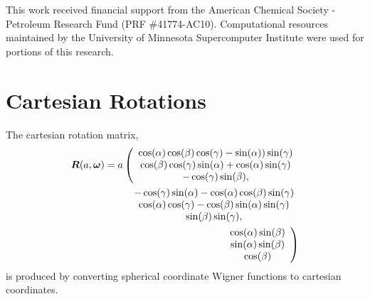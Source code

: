 \documentclass[preprint]{revtex4}              %
\newcommand{\mb}[1]{\ensuremath{\mbox{\boldmath $ #1 $}}}
\begin{document}
This work received financial support from the American Chemical
Society - Petroleum Research Fund (PRF \#41774-AC10).
%
Computational resources maintained by the University of Minnesota
Supercomputer Institute were used for portions of this research.

\appendix

\section{Cartesian Rotations}
\label{cartRot}

The cartesian rotation matrix,
\begin{eqnarray}
\mb{R}(a,\mb{\omega})=a\left(\begin{array}{c}\cos(\alpha)\cos(\beta)\cos(\gamma)
- \sin(\alpha))\sin(\gamma) \\
\cos(\beta)\cos(\gamma)\sin(\alpha) + \cos(\alpha)\sin(\gamma) \\
    -\cos(\gamma) \sin(\beta),\end{array} \right. \nonumber\\
%
\begin{array}{c}-\cos(\gamma)\sin(\alpha)-\cos(\alpha) \cos(\beta) \sin(\gamma)\\
\cos(\alpha)\cos(\gamma) - \cos(\beta)\sin(\alpha)\sin(\gamma) \\
    \sin(\beta) \sin(\gamma),\end{array} \nonumber\\
%
\left. \begin{array}{c}\cos(\alpha) \sin(\beta)\\
\sin(\alpha) \sin(\beta)\\
    \cos(\beta)\end{array}\right)
\end{eqnarray}
is produced by converting spherical coordinate Wigner functions to
cartesian coordinates.


\end{document}
